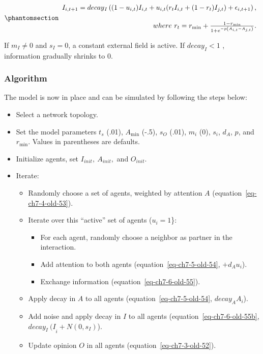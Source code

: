 \documentclass[
  a4paper,
  DIV=11,
  numbers=noendperiod,
  oneside]{scrreprt}
\begin{document}
\begin{equation}\phantomsection\label{eq-ch7-6-old-55b}{\begin{array}{r}
I_{i,t+1}=decay{_I} \left((1-u_{i,t} )I_{i,t}+u_{i,t} (r_{t}I_{i,t}+(1-r_{t}) I_{j,t})+\epsilon_{i,t+1}\right),\\
\\[0.2em]
where\ r_{t} = r_{\min} + \frac{1 - r_{\min}}{1 + e^{- p\left( A_{i,t} - A_{j,t} \right)}}. \\
\end{array}}\end{equation}

If \(m_{I} \neq 0\) and \(s_{I} = 0\), a constant external field is
active. If \(decay_I < 1\) , information gradually shrinks to 0.

\subsubsection{Algorithm}\label{sec-Algorithm}

The model is now in place and can be simulated by following the steps
below:

\begin{itemize}
\item
  Select a network topology.
\item
  Set the model parameters \(t_{s}\) (.01), \(A_{\min}\) (-.5),
  \(s_{O}\) (.01), \(m_{i}\) (0), \(s_{i}\), \(d_{A}\), \(p\), and
  \(r_{\min}\). Values in parentheses are defaults.
\item
  Initialize agents, set \(I_{init},\ A_{init},\) and \(O_{init}\).
\item
  Iterate:

  \begin{itemize}
  \item
    Randomly choose a set of agents, weighted by attention \(A\)
    (equation~\ref{eq-ch7-4-old-53}).
  \item
    Iterate over this ``active'' set of agents (\(u_{i} = 1\)\}:

    \begin{itemize}
    \item
      For each agent, randomly choose a neighbor as partner in the
      interaction.
    \item
      Add attention to both agents (equation~\ref{eq-ch7-5-old-54},
      \(+ d_{A}u_{i}\)).
    \item
      Exchange information (equation~\ref{eq-ch7-6-old-55}).
    \end{itemize}
  \item
    Apply decay in \(A\) to all agents (equation~\ref{eq-ch7-5-old-54},
    \({decay}_{A}A_{i}\)).
  \item
    Add noise and apply decay in \(I\) to all agents
    (equation~\ref{eq-ch7-6-old-55b},
    \({decay_{I}\ (I}_{i} + Ν(0,s_{I})\)).
  \item
    Update opinion \(O\) in all agents (equation~\ref{eq-ch7-3-old-52}).
  \end{itemize}
\end{itemize}
\end{document}
